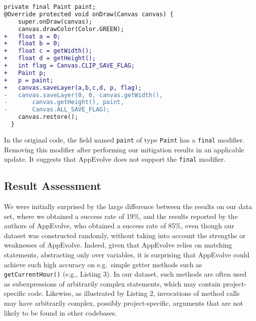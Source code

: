 
\begin{lstlisting}[language=diff,numbers=none]
private final Paint paint;
@Override protected void onDraw(Canvas canvas) {
    super.onDraw(canvas);
    canvas.drawColor(Color.GREEN);
+   float a = 0;
+   float b = 0;
+   float c = getWidth();
+   float d = getHeight();
+   int flag = Canvas.CLIP_SAVE_FLAG;
+   Paint p;
+   p = paint;
+   canvas.saveLayer(a,b,c,d, p, flag);
-   canvas.saveLayer(0, 0, canvas.getWidth(),
-       canvas.getHeight(), paint,
-       Canvas.ALL_SAVE_FLAG);
    canvas.restore();
  }
\end{lstlisting}

\vspace{\baselineskip}

In the original code, the field named {\tt paint} of type {\tt Paint} has a
{\tt final} modifier. Removing this modifier after performing our
mitigation results in an applicable update. It suggests that AppEvolve does
not support the {\tt final} modifier.

\subsection{Result Assessment}

We were initially surprised by the large difference between the results on
our data set, where we obtained a success rate of 19\%, and the results
reported by the authors of AppEvolve, who obtained a success rate of
85\%, even though our dataset was constructed randomly, without taking
into account the strengths or weaknesses of AppEvolve.  Indeed, given that
AppEvolve relies on matching statements, abstracting only over variables,
it is surprising that AppEvolve could achieve such high accuracy on
e.g.\ simple getter methods such as {\tt getCurrentHour()} (e.g., Listing
3). In our dataset, such methods are often used as subexpressions of
arbitrarily complex statements, which may contain project-specific code.
Likewise, as illustrated by Listing 2, invocations of method calls may have
arbitrarily complex, possibly project-specific, arguments that are not
likely to be found in other codebases.

